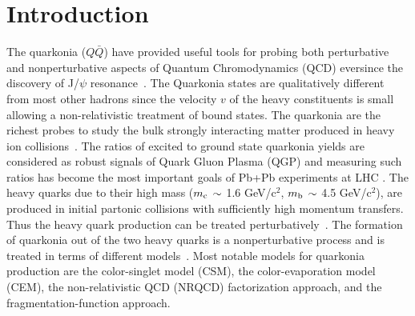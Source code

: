 \documentclass[aps,prc,preprint,superscriptaddress,showpacs,showkeys,amsmath]{revtex4-1}
\begin{document}
\maketitle


\section{Introduction}

 The quarkonia ($Q\bar Q$) have provided useful tools for probing both 
perturbative and nonperturbative aspects of Quantum Chromodynamics (QCD) 
eversince the discovery of J/$\psi$ resonance~\cite{Augustin:1974xw,Aubert:1974js}. 
 The Quarkonia states are qualitatively different from most other hadrons since 
the velocity $v$ of the heavy constituents is small allowing a 
non-relativistic treatment of bound states. 
  The quarkonia are the richest probes to study the bulk strongly interacting matter
produced in heavy ion collisions~\cite{Kumar:2014kfa}. The ratios of excited to ground state 
quarkonia yields are considered as robust signals of Quark Gluon Plasma (QGP) and
measuring such ratios has become the most important goals of Pb+Pb experiments
at LHC \cite{Chatrchyan:2012lxa,Khachatryan:2014bva}.
  The heavy quarks due to their high mass 
($m_{\rm c}\,\sim$ 1.6 GeV/c$^2$, $m_{\rm b}\,\sim$ 4.5 GeV/c$^2$), 
are produced in initial partonic collisions with sufficiently high momentum 
transfers. Thus the heavy quark production can be treated 
perturbatively~\cite{Nason:1987xz,Nason:1989zy}.
  The formation of quarkonia out of the two heavy quarks is a nonperturbative 
process and is treated in terms of different 
models~\cite{Bodwin:1994jh,Brambilla:2010cs,Brambilla:2014jmp}. 
  Most notable models for quarkonia production are the color-singlet
model (CSM), the color-evaporation model (CEM), the non-relativistic QCD
(NRQCD) factorization approach, and the fragmentation-function approach.
\end{document}
